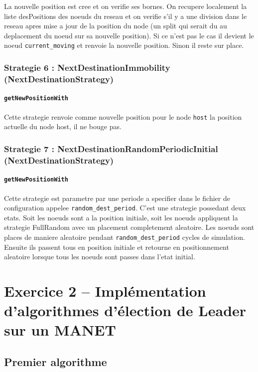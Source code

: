 \documentclass[11pt,a4paper,sans]{report}
\begin{document}
	La nouvelle position est cree et on verifie ses bornes. On recupere localement la liste desPositions des noeuds du reseau et on verifie s'il y a une division dans le reseau apres mise a jour de la position du node (un split qui serait du au deplacement du noeud sur sa nouvelle position). Si ce n'est pas le cas il devient le noeud \texttt{current\_moving} et renvoie la nouvelle position. Sinon il reste sur place. 




	\subsection*{Strategie 6 : NextDestinationImmobility (NextDestinationStrategy)}
	\subsubsection{\texttt{getNewPositionWith}}
	Cette strategie renvoie comme nouvelle position pour le node \texttt{host} la position actuelle du node host, il ne bouge pas.



	\subsection*{Strategie 7 : NextDestinationRandomPeriodicInitial (NextDestinationStrategy)}
	\subsubsection{\texttt{getNewPositionWith}}
	Cette strategie est parametre par une periode a specifier dans le fichier de configuration appelee \texttt{random\_dest\_period}. C'est une strategie possedant deux etats. Soit les noeuds sont a la position initiale, soit les noeuds appliquent la strategie FullRandom avec un placement completement aleatoire. Les noeuds sont places de maniere aleatoire pendant \texttt{random\_dest\_period} cycles de simulation. Ensuite ils passent tous en position initiale et retourne en positionnement aleatoire lorsque tous les noeuds sont passes dans l'etat initial.


	\newpage
	\chapter{Exercice 2 – Implémentation d’algorithmes d’élection de Leader sur un MANET}
	\section*{Premier algorithme}
\end{document}
